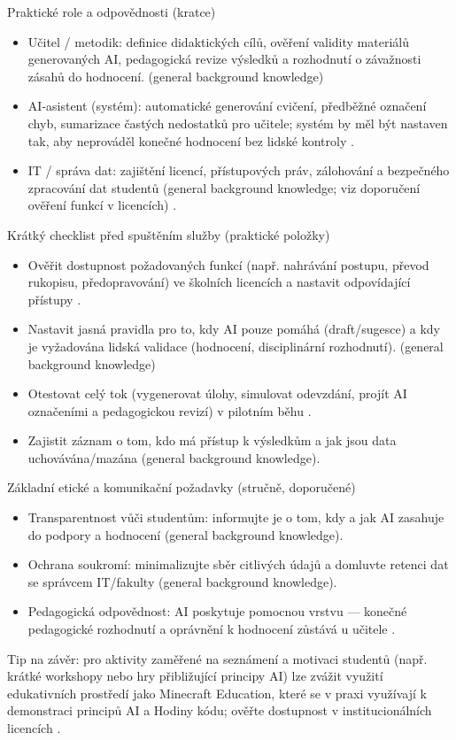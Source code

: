 Praktické role a odpovědnosti (kratce)
\begin{itemize}
  \item Učitel / metodik: definice didaktických cílů, ověření validity materiálů generovaných AI, pedagogická revize výsledků a rozhodnutí o závažnosti zásahů do hodnocení. (general background knowledge)
  \item AI‑asistent (systém): automatické generování cvičení, předběžné označení chyb, sumarizace častých nedostatků pro učitele; systém by měl být nastaven tak, aby neprováděl konečné hodnocení bez lidské kontroly \cite{kb_ai_101_tipu_pdf_04e4a115_page_8_1}.
  \item IT / správa dat: zajištění licencí, přístupových práv, zálohování a bezpečného zpracování dat studentů (general background knowledge; viz doporučení ověření funkcí v licencích) \cite{kb_ai_101_tipu_pdf_04e4a115_page_8_1}.
\end{itemize}

Krátký checklist před spuštěním služby (praktické položky)
\begin{itemize}
  \item Ověřit dostupnost požadovaných funkcí (např. nahrávání postupu, převod rukopisu, předopravování) ve školních licencích a nastavit odpovídající přístupy \cite{kb_ai_101_tipu_pdf_04e4a115_page_8_1}.
  \item Nastavit jasná pravidla pro to, kdy AI pouze pomáhá (draft/sugesce) a kdy je vyžadována lidská validace (hodnocení, disciplinární rozhodnutí). (general background knowledge)
  \item Otestovat celý tok (vygenerovat úlohy, simulovat odevzdání, projít AI označeními a pedagogickou revizí) v pilotním běhu \cite{kb_ai_101_tipu_pdf_04e4a115_page_8_1}.
  \item Zajistit záznam o tom, kdo má přístup k výsledkům a jak jsou data uchovávána/mazána (general background knowledge).
\end{itemize}

Základní etické a komunikační požadavky (stručně, doporučené)
\begin{itemize}
  \item Transparentnost vůči studentům: informujte je o tom, kdy a jak AI zasahuje do podpory a hodnocení (general background knowledge).
  \item Ochrana soukromí: minimalizujte sběr citlivých údajů a domluvte retenci dat se správcem IT/fakulty (general background knowledge).
  \item Pedagogická odpovědnost: AI poskytuje pomocnou vrstvu — konečné pedagogické rozhodnutí a oprávnění k hodnocení zůstává u učitele \cite{kb_ai_101_tipu_pdf_04e4a115_page_8_1}.
\end{itemize}

Tip na závěr: pro aktivity zaměřené na seznámení a motivaci studentů (např. krátké workshopy nebo hry přibližující principy AI) lze zvážit využití edukativních prostředí jako Minecraft Education, které se v praxi využívají k demonstraci principů AI a Hodiny kódu; ověřte dostupnost v institucionálních licencích \cite{kb_ai_101_tipu_pdf_04e4a115_page_15_2}.